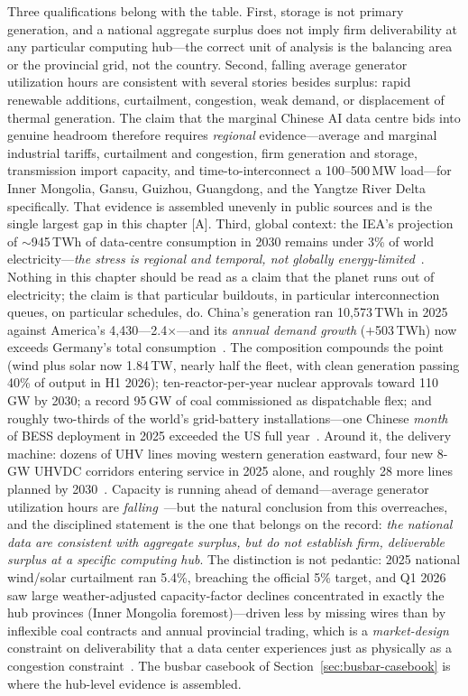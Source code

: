 Three qualifications belong with the table. First, storage is not primary generation, and a national aggregate surplus does not imply firm deliverability at any particular computing hub---the correct unit of analysis is the balancing area or the provincial grid, not the country. Second, falling average generator utilization hours are consistent with several stories besides surplus: rapid renewable additions, curtailment, congestion, weak demand, or displacement of thermal generation. The claim that the marginal Chinese AI data centre bids into genuine headroom therefore requires \emph{regional} evidence---average and marginal industrial tariffs, curtailment and congestion, firm generation and storage, transmission import capacity, and time-to-interconnect a 100--500\,MW load---for Inner Mongolia, Gansu, Guizhou, Guangdong, and the Yangtze River Delta specifically. That evidence is assembled unevenly in public sources and is the single largest gap in this chapter [A]. Third, global context: the IEA's projection of $\sim$945\,TWh of data-centre consumption in 2030 remains under 3\% of world electricity---\emph{the stress is regional and temporal, not globally energy-limited}~\cite{iea-energy-ai}. Nothing in this chapter should be read as a claim that the planet runs out of electricity; the claim is that particular buildouts, in particular interconnection queues, on particular schedules, do. China's generation ran 10,573\,TWh in 2025 against America's 4,430---2.4$\times$---and its \emph{annual demand growth} ($+$503\,TWh) now exceeds Germany's total consumption~\cite{ember-2026}. The composition compounds the point (wind plus solar now 1.84\,TW, nearly half the fleet, with clean generation passing 40\% of output in H1 2026); ten-reactor-per-year nuclear approvals toward 110\,GW by 2030; a record 95\,GW of coal commissioned as dispatchable flex; and roughly two-thirds of the world's grid-battery installations---one Chinese \emph{month} of BESS deployment in 2025 exceeded the US full year~\cite{china-capacity,nuclear-china,coal-2025,bess-2025}. Around it, the delivery machine: dozens of UHV lines moving western generation eastward, four new 8-GW UHVDC corridors entering service in 2025 alone, and roughly 28 more lines planned by 2030~\cite{uhv,oies-china-dc}. Capacity is running ahead of demand---average generator utilization hours are \emph{falling}~\cite{china-capacity}---but the natural conclusion from this overreaches, and the disciplined statement is the one that belongs on the record: \emph{the national data are consistent with aggregate surplus, but do not establish firm, deliverable surplus at a specific computing hub}. The distinction is not pedantic: 2025 national wind/solar curtailment ran 5.4\%, breaching the official 5\% target, and Q1 2026 saw large weather-adjusted capacity-factor declines concentrated in exactly the hub provinces (Inner Mongolia foremost)---driven less by missing wires than by inflexible coal contracts and annual provincial trading, which is a \emph{market-design} constraint on deliverability that a data center experiences just as physically as a congestion constraint~\cite{doc136}. The busbar casebook of Section~\ref{sec:busbar-casebook} is where the hub-level evidence is assembled.


